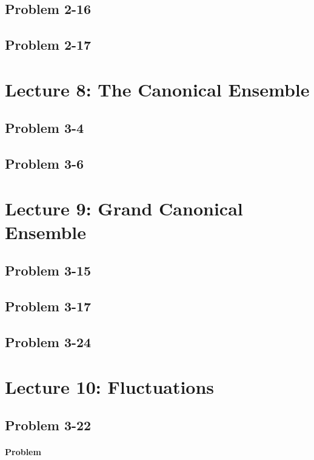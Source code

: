 \documentclass[reprint]{revtex4-1}
\numberwithin{equation}{section}
\begin{document}
\subsection{Problem 2-16}

\subsection{Problem 2-17}

\section{Lecture 8: The Canonical Ensemble}

\subsection{Problem 3-4}

\subsection{Problem 3-6}

\section{Lecture 9: Grand Canonical Ensemble}

\subsection{Problem 3-15}

\subsection{Problem 3-17}

\subsection{Problem 3-24}

\section{Lecture 10: Fluctuations}

\subsection{Problem 3-22}

\paragraph*{Problem}
\end{document}
